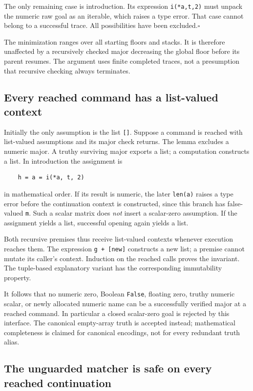 \documentclass[11pt]{article}
\theoremstyle{definition}\newtheorem{definition}[theorem]{Definition}
\begin{document}
The only remaining case is introduction.  Its expression
\texttt{i(*a,t,2)} must unpack the numeric raw goal as an iterable,
which raises a type error.  That case cannot belong to a successful
trace.  All possibilities have been excluded.\hfill$\square$

The minimization ranges over all starting floors and stacks.  It is
therefore unaffected by a recursively checked major decreasing the
global floor before its parent resumes.  The argument uses finite
completed traces, not a presumption that recursive checking always
terminates.

\subsection{Every reached command has a list-valued context}

Initially the only assumption is the list \texttt{[]}.  Suppose a
command is reached with list-valued assumptions and its major check
returns.  The lemma excludes a numeric major.  A truthy surviving major
exports a list; a computation constructs a list.  In introduction the
assignment is
\begin{verbatim}
    h = a = i(*a, t, 2)
\end{verbatim}
in mathematical order.  If its result is numeric, the later
\texttt{len(a)} raises a type error before the continuation context is
constructed, since this branch has false-valued \texttt{m}.  Such a
scalar matrix does \emph{not} insert a scalar-zero assumption.  If the
assignment yields a list, successful opening again yields a list.

Both recursive premises thus receive list-valued contexts whenever
execution reaches them.  The expression \texttt{g + [new]} constructs a
new list; a premise cannot mutate its caller's context.  Induction on
the reached calls proves the invariant.  The tuple-based explanatory
variant has the corresponding immutability property.

It follows that no numeric zero, Boolean \texttt{False}, floating zero,
truthy numeric scalar, or newly allocated numeric name can be a
successfully verified major at a reached command.  In particular a
closed scalar-zero goal is rejected by this interface.  The canonical
empty-array truth is accepted instead; mathematical completeness is
claimed for canonical encodings, not for every redundant truth alias.

\subsection{The unguarded matcher is safe on every reached continuation}
\end{document}
